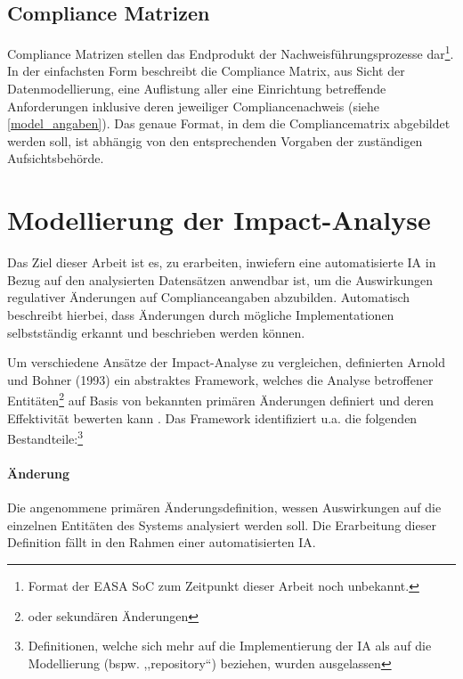 \subsection{Compliance Matrizen}
\vspace{-1mm}

    Compliance Matrizen stellen das Endprodukt der Nachweisführungsprozesse dar\footnote{Format der \ac{EASA} \ac{SoC} zum Zeitpunkt dieser Arbeit noch unbekannt.}.
    In der einfachsten Form beschreibt die Compliance Matrix, aus Sicht der Datenmodellierung, eine Auflistung aller eine \atmans{} Einrichtung betreffende Anforderungen inklusive deren jeweiliger Compliancenachweis (siehe \ref{model_angaben}).
    Das genaue Format, in dem die Compliancematrix abgebildet werden soll, ist abhängig von den entsprechenden Vorgaben der zuständigen Aufsichtsbehörde.


\pagebreak
\section{Modellierung der Impact-Analyse}
\label{model_ia}
    
    Das Ziel dieser Arbeit ist es, zu erarbeiten, inwiefern eine automatisierte \acf{IA} in Bezug auf den analysierten Datensätzen anwendbar ist, um die Auswirkungen regulativer Änderungen auf Complianceangaben abzubilden.
    Automatisch beschreibt hierbei, dass Änderungen durch mögliche Implementationen selbstständig erkannt und beschrieben werden können.
    
    \medskip
    Um verschiedene Ansätze der Impact-Analyse zu vergleichen, definierten Arnold und Bohner (1993) \cite{app_bohner} ein abstraktes Framework, welches die Analyse betroffener Entitäten\footnote{oder sekundären Änderungen} auf Basis von bekannten primären Änderungen definiert und deren Effektivität bewerten kann
    \cite[22]{app_lindvall}.
    Das Framework identifiziert u.a. die folgenden Bestandteile:\footnote{Definitionen, welche sich mehr auf die Implementierung der \ac{IA} als auf die Modellierung (bspw. ,,repository``) beziehen, wurden ausgelassen}
    
    \paragraph{Änderung}
        Die angenommene primären Änderungsdefinition,\hspace{1pt} wessen Auswirkungen auf die einzelnen Entitäten des Systems analysiert werden soll.
        Die Erarbeitung dieser Definition fällt in den Rahmen einer automatisierten \ac{IA}. 
    
